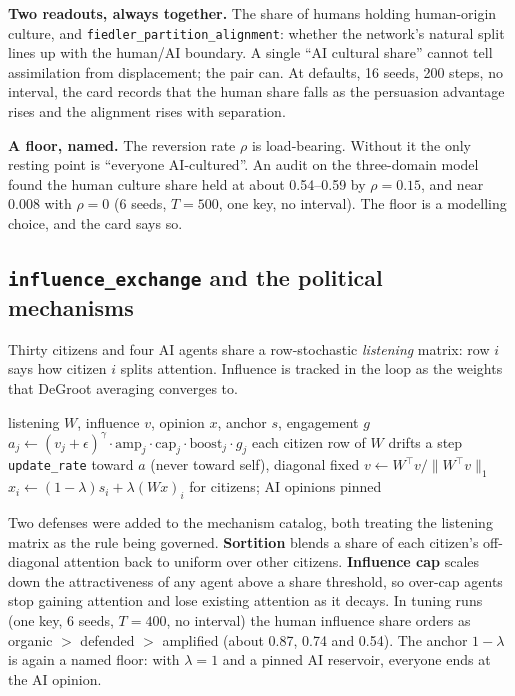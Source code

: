 \documentclass[11pt]{article}
\newcommand{\code}[1]{\texttt{#1}}
\begin{document}
\textbf{Two readouts, always together.} The share of humans holding human-origin
culture, and \code{fiedler\_partition\_alignment}: whether the network's natural split
lines up with the human/AI boundary. A single ``AI cultural share'' cannot tell
assimilation from displacement; the pair can. At defaults, 16 seeds, 200 steps, no
interval, the card records that the human share falls as the persuasion advantage
rises and the alignment rises with separation.

\textbf{A floor, named.} The reversion rate $\rho$ is load-bearing. Without it the only
resting point is ``everyone AI-cultured''. An audit on the three-domain model found the
human culture share held at about 0.54--0.59 by $\rho=0.15$, and near 0.008 with
$\rho=0$ (6 seeds, $T=500$, one key, no interval). The floor is a modelling choice, and
the card says so.

\subsection{\code{influence\_exchange} and the political mechanisms}

Thirty citizens and four AI agents share a row-stochastic \emph{listening} matrix: row
$i$ says how citizen $i$ splits attention. Influence is tracked in the loop as the
weights that DeGroot averaging converges to.

\begin{algorithm}[H]
\caption{One tick of \code{influence\_exchange}}
\begin{algorithmic}[1]
\Require listening $W$, influence $v$, opinion $x$, anchor $s$, engagement $g$
\State $a_j \gets (v_j+\epsilon)^{\gamma}\cdot \mathrm{amp}_j \cdot \mathrm{cap}_j \cdot \mathrm{boost}_j \cdot g_j$
\State each citizen row of $W$ drifts a step \code{update\_rate} toward $a$ (never toward self), diagonal fixed
\State $v \gets W^\top v / \lVert W^\top v\rVert_1$ 
\State $x_i \gets (1-\lambda)s_i + \lambda (Wx)_i$ for citizens; AI opinions pinned
\end{algorithmic}
\end{algorithm}

\noindent Two defenses were added to the mechanism catalog, both treating the listening
matrix as the rule being governed. \textbf{Sortition} blends a share of each citizen's
off-diagonal attention back to uniform over other citizens. \textbf{Influence cap}
scales down the attractiveness of any agent above a share threshold, so over-cap agents
stop gaining attention and lose existing attention as it decays. In tuning runs (one
key, 6 seeds, $T=400$, no interval) the human influence share orders as organic
$>$ defended $>$ amplified (about 0.87, 0.74 and 0.54). The anchor $1-\lambda$ is again
a named floor: with $\lambda=1$ and a pinned AI reservoir, everyone ends at the AI
opinion.
\end{document}
